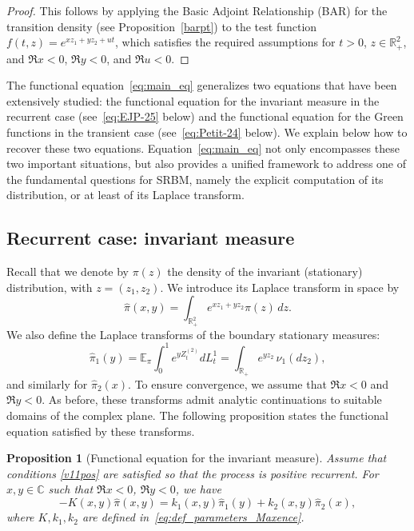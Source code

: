 \documentclass[11pt]{article}
\newtheorem{prop}[thm]{Proposition}
\theoremstyle{definition}
\begin{document}
\begin{proof}
This follows by applying the Basic Adjoint Relationship (BAR) for the transition density (see Proposition~\ref{barpt}) to the test function $f(t,z)=e^{xz_1+yz_2+ut}$, which satisfies the required assumptions for $t>0$, $z\in\mathbb{R}_+^2$, and $\Re x<0$, $\Re y<0$, and $\Re u<0$.
\end{proof}

The functional equation~\eqref{eq:main_eq} generalizes two equations that have been extensively studied: the functional equation for the invariant measure in the recurrent case (see~\eqref{eq:EJP-25} below) and the functional equation for the Green functions in the transient case (see~\eqref{eq:Petit-24} below). 
We explain below how to recover these two equations.
Equation~\eqref{eq:main_eq} not only encompasses these two important situations, but also provides a unified framework to address one of the fundamental questions for SRBM, namely the explicit computation of its distribution, or at least of its Laplace transform.





\subsection{Recurrent case: invariant measure}

Recall that we denote by $\pi(z)$ the density of the invariant (stationary) distribution, with $z=(z_1,z_2)$.
We introduce its Laplace transform in space by
\begin{equation}
\label{eq:Lap_pi}
\widehat \pi (x,y)
=
\int_{\mathbb R_+^2} e^{x z_1+yz_2}\pi(z)\,dz.
\end{equation}
We also define the Laplace transforms of the boundary stationary measures:
\begin{equation}
\label{eq:Lap_pi1}
\widehat \pi_1(y)
=\mathbb{E}_{\pi} \int_0^1 e^{y Z_t^{(2)}} dL_t^1=
\int_{\mathbb R_+} e^{y z_2}\,\nu_1(dz_2),
\end{equation}
and similarly for $\widehat \pi_2(x)$.
To ensure convergence, we assume that $\Re x<0$ and $\Re y<0$. As before, these transforms admit analytic continuations to suitable domains of the complex plane.
The following proposition states the functional equation satisfied by these transforms.

\begin{prop}[Functional equation for the invariant measure]
Assume that conditions \eqref{v11pos} are satisfied so that the process is positive recurrent. For $x,y\in\mathbb{C}$ such that $\Re x<0$, $\Re y<0$, we have
\begin{equation}
\label{eq:EJP-25}
- K(x,y)\widehat{\pi}(x,y)
=
k_1(x,y)\widehat{\pi}_1(y)
+
k_2(x,y)\widehat{\pi}_2(x),
\end{equation}
where $K,k_1,k_2$ are defined in~\eqref{eq:def_parameters_Maxence}.
\end{prop}
\end{document}
